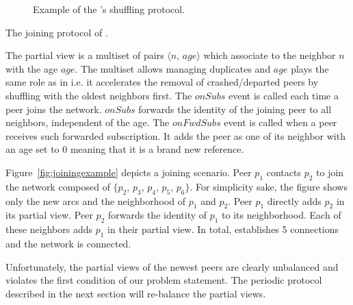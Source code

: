 \begin{figure*}
  \centering
  \hspace{10pt}
  \hspace{10pt}
  \caption{\label{fig:cyclicexample}Example of the \SPRAY's shuffling
    protocol. }
\end{figure*}

\begin{algorithm}

\caption{\label{algo:joining}The joining protocol of \SPRAY.}
\end{algorithm}

The partial view is a multiset of pairs $\langle n,\, age\rangle$ which
associate to the neighbor $n$ with the age $age$. The multiset allows managing
duplicates and $age$ plays the same role as in \CYCLON i.e.  it accelerates
the removal of crashed/departed peers by shuffling with the oldest neighbors
first. The $onSubs$ event is called each time a peer joins the
network. $onSubs$ forwards the identity of the joining peer to all neighbors,
independent of the age. The $onFwdSubs$ event is called when a peer receives
such forwarded subscription. It adds the peer as one of its neighbor with an
age set to $0$ meaning that it is a brand new reference.

Figure~\ref{fig:joiningexample} depicts a joining scenario.
Peer $p_1$ contacts $p_2$ to join the network composed of $\{p_2$, $p_3$,
$p_4$, $p_5$, $p_6\}$. For simplicity sake, the figure shows only the new arcs
and the neighborhood of $p_1$ and $p_2$. Peer $p_1$ directly adds $p_2$ in its
partial view. Peer $p_2$ forwards the identity of $p_1$ to its
neighborhood. Each of these neighbors adds $p_1$ in their partial view. In
total, \SPRAY establishes 5 connections and the network is connected.

Unfortunately, the partial views of the newest peers are clearly unbalanced and
violates the first condition of our problem statement. The periodic protocol
described in the next section will re-balance the partial views.

